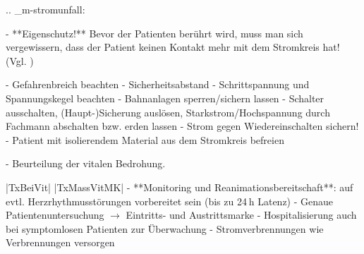 {
.. _m-stromunfall:

}
{
\begin{itemize}
  -   **Eigenschutz!** Bevor der Patienten berührt wird,
  muss man sich vergewissern, dass der Patient
  keinen Kontakt mehr mit dem Stromkreis hat!  (Vgl. )
  \begin{itemize}
    -   Gefahrenbreich beachten
    -   Sicherheitsabstand
    -   Schrittspannung und Spannungskegel
    beachten 
    -   Bahnanlagen sperren/sichern lassen
    -   Schalter ausschalten, (Haupt-)Sicherung
    auslösen, Starkstrom/Hochspannung durch Fachmann  abschalten bzw.
    erden lassen
    -   Strom gegen Wiedereinschalten sichern!
    -   Patient mit isolierendem Material aus dem Stromkreis befreien
  \end{itemize}
  -   Beurteilung der vitalen Bedrohung.
  \par |TxBeiVit|
  |TxMassVitMK|
  -   **Monitoring und
  Reanimationsbereitschaft**: auf evtl.
  Herzrhythmusstörungen vorbereitet sein
  (bis zu 24 h Latenz)
  -   Genaue Patientenuntersuchung ${\rightarrow}$
  Eintritts- und Austrittsmarke
  -   Hospitalisierung auch bei symptomlosen
  Patienten zur Überwachung
  -   Stromverbrennungen wie Verbrennungen versorgen
\end{itemize}
}
